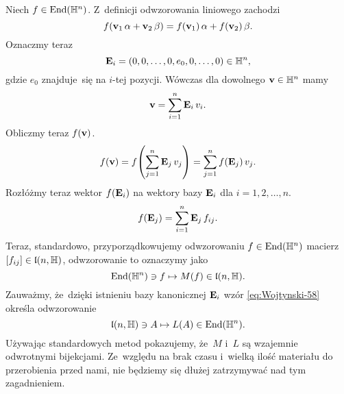 \documentclass[a4paper,11pt]{article}
\begin{document}
Niech $f \in \mathrm{End}( \mathbb{H}^{ n } )$. Z~definicji odwzorowania liniowego zachodzi
\begin{equation}
  \label{eq:Wojtynski-61}
  f( \mathbf{v}_{ 1 } \, \alpha + \mathbf{v}_{ 2 } \, \beta ) =
  f( \mathbf{v}_{ 1 } ) \, \alpha + f( \mathbf{v}_{ 2 } ) \, \beta.
\end{equation}
Oznaczmy teraz
\begin{equation}
  \label{eq:Wojtynski-62}
  \mathbf{E}_{ i } = ( 0, 0, \ldots, 0, e_{ 0 }, 0, \ldots, 0 ) \in \mathbb{H}^{ n },
\end{equation}
gdzie $e_{ 0 }$ znajduje~się na $i$-tej pozycji. Wówczas dla dowolnego
$\mathbf{v} \in \mathbb{H}^{ n }$ mamy
\begin{equation}
  \label{eq:Wojtynski-63}
  \mathbf{v} = \sum_{ i = 1 }^{ n } \mathbf{E}_{ i } \, v_{ i }.
\end{equation}
Obliczmy teraz $f( \mathbf{v} )$.
\begin{equation}
  \label{eq:Wojtynski-64}
  f( \mathbf{v} ) =
  f\!\left( \sum_{ j = 1 }^{ n } \mathbf{E}_{ j } \, v_{ j } \right) =
  \sum_{ j = 1 }^{ n } f( \mathbf{E}_{ j } ) \, v_{ j }.
\end{equation}
Rozłóżmy teraz wektor $f( \mathbf{E}_{ i } )$ na wektory bazy
$\mathbf{E}_{ i }$ dla $i = 1, 2, \ldots, n$.
\begin{equation}
  \label{eq:Wojtynski-65}
  f( \mathbf{E}_{ j } ) = \sum_{ i = 1 }^{ n } \mathbf{E}_{ j } \, f_{ i j }.
\end{equation}
Teraz, standardowo, przyporządkowujemy odwzorowaniu $f \in \mathrm{End}( \mathbb{H}^{ n } )$
macierz $[ f_{ i j } ] \in \mathfrak{l}( n, \mathbb{H} )$, odwzorowanie to oznaczymy jako
\begin{equation}
  \label{eq:Wojtynski-66}
  \mathrm{End}( \mathbb{H}^{ n } ) \ni f \mapsto M( f ) \in \mathfrak{l}( n, \mathbb{H} ).
\end{equation}
Zauważmy, że~dzięki istnieniu bazy kanonicznej $\mathbf{E}_{ i }$ wzór
\eqref{eq:Wojtynski-58} określa odwzorowanie
\begin{equation}
  \label{eq:Wojtynski-67}
  \mathfrak{l}( n, \mathbb{H} ) \ni A \mapsto L( A ) \in \mathrm{End}( \mathbb{H}^{ n } ).
\end{equation}
Używając standardowych metod pokazujemy, że~$M$ i~$L$ są wzajemnie
odwrotnymi bijekcjami. Ze~względu na brak czasu i~wielką ilość materiału do
przerobienia przed nami, nie będziemy się dłużej zatrzymywać nad tym
zagadnieniem.
\end{document}

